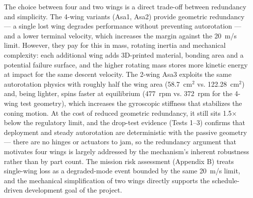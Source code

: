 The choice between four and two wings is a direct trade-off between
redundancy and simplicity. The 4-wing variants (Asa1, Asa2) provide
geometric redundancy --- a single lost wing degrades performance
without preventing autorotation --- and a lower terminal velocity,
which increases the margin against the 20~m/s limit. However, they pay
for this in mass, rotating inertia and mechanical
complexity: each additional wing adds 3D-printed material, bonding
area and a potential failure surface, and the higher rotating mass
stores more kinetic energy at impact for the same descent velocity.
The 2-wing Asa3 exploits the same autorotation physics with roughly
half the wing area (58.7~cm$^2$ vs. 122.28~cm$^2$) and, being
lighter, spins faster at equilibrium (477~rpm vs. 372~rpm for the
4-wing test geometry), which increases the gyroscopic stiffness that
stabilizes the coning motion. At the cost of reduced geometric
redundancy, it still sits 1.5$\times$ below the regulatory limit, and
the drop-test evidence (Tests 1--3) confirms that deployment and
steady autorotation are deterministic with the passive geometry ---
there are no hinges or actuators to jam, so the redundancy argument
that motivates four wings is largely addressed by the mechanism's
inherent robustness rather than by part count. The mission risk
assessment (Appendix B) treats single-wing loss as a degraded-mode
event bounded by the same 20~m/s limit, and the mechanical
simplification of two wings directly supports the schedule-driven
development goal of the project.

